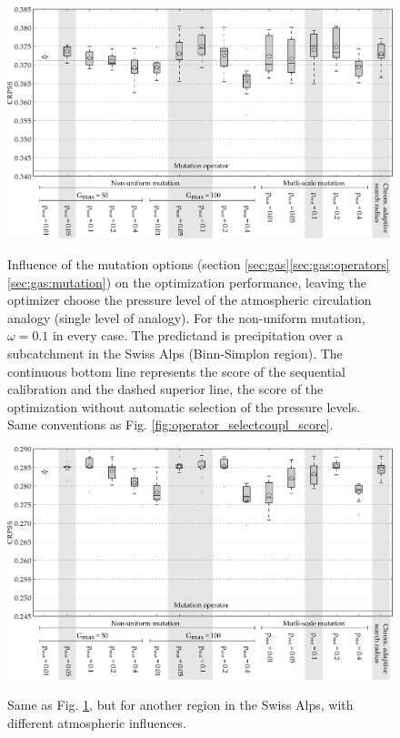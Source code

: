 \documentclass{ametsoc}
\begin{document}
\begin{figure}[t]
	\begin{center}
		\noindent\includegraphics[width=33pc,angle=0]{fig08.pdf}\\
	\end{center}
	\caption{Influence of the mutation options (section \ref{sec:gas}\ref{sec:gas:operators}\ref{sec:gas:mutation}) on the optimization performance, leaving the optimizer choose the pressure level of the atmospheric circulation analogy (single level of analogy). For the non-uniform mutation, $\omega=0.1$ in every case. The predictand is precipitation over a subcatchment in the Swiss Alps (Binn-Simplon region). The continuous bottom line represents the score of the sequential calibration and the dashed superior line, the score of the optimization without automatic selection of the pressure levels. Same conventions as Fig. \ref{fig:operator_selectcoupl_score}.}
	\label{fig:operator_mutation_score_atmlevel}
\end{figure}

\begin{figure}[t]
	\begin{center}
		\noindent\includegraphics[width=33pc,angle=0]{fig09.pdf}\\
	\end{center}
	\caption{Same as Fig. \ref{fig:operator_mutation_score_atmlevel}, but for another region in the Swiss Alps, with different atmospheric influences.}
	\label{fig:operator_mutation_score_rhoneamont}
\end{figure}
\end{document}

